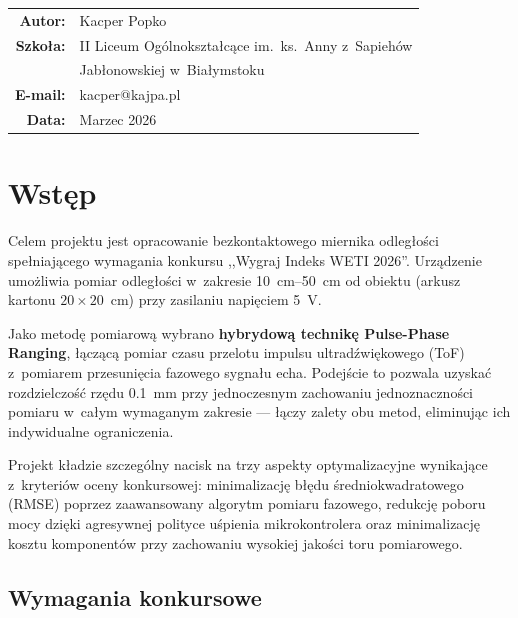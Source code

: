 \documentclass[a4paper,11pt]{article}
\begin{document}
\begin{titlepage}
    \vfill

    {\large
    \begin{tabular}{rl}
        \textbf{Autor:}  & Kacper Popko \\
        \textbf{Szkoła:}  & II Liceum Ogólnokształcące im.\ ks.\ Anny z~Sapiehów \\
                          & Jabłonowskiej w~Białymstoku \\
        \textbf{E-mail:}  & kacper@kajpa.pl \\
        \textbf{Data:}    & Marzec 2026 \\
    \end{tabular}
    }

    \vspace{1cm}
\end{titlepage}

\tableofcontents
\newpage

\section{Wstęp}
\label{sec:wstep}

Celem projektu jest opracowanie bezkontaktowego miernika odległości spełniającego
wymagania konkursu ,,Wygraj Indeks WETI 2026''. Urządzenie umożliwia pomiar
odległości w~zakresie \SIrange{10}{50}{\centi\metre} od obiektu (arkusz kartonu
$20 \times 20$~\si{\centi\metre}) przy zasilaniu napięciem \SI{5}{\volt}.

Jako metodę pomiarową wybrano \textbf{hybrydową technikę Pulse-Phase Ranging},
łączącą pomiar czasu przelotu impulsu ultradźwiękowego (ToF) z~pomiarem
przesunięcia fazowego sygnału echa. Podejście to pozwala uzyskać rozdzielczość
rzędu \SI{0,1}{\milli\metre} przy jednoczesnym zachowaniu jednoznaczności pomiaru
w~całym wymaganym zakresie --- łączy zalety obu metod, eliminując ich indywidualne
ograniczenia.

Projekt kładzie szczególny nacisk na trzy aspekty optymalizacyjne wynikające
z~kryteriów oceny konkursowej: minimalizację błędu średniokwadratowego (RMSE)
poprzez zaawansowany algorytm pomiaru fazowego, redukcję poboru mocy dzięki
agresywnej polityce uśpienia mikrokontrolera oraz minimalizację kosztu
komponentów przy zachowaniu wysokiej jakości toru pomiarowego.

\subsection{Wymagania konkursowe}
\end{document}

